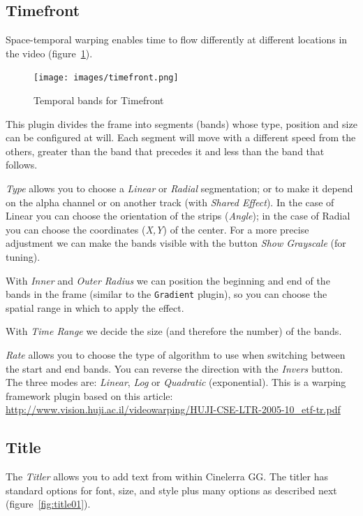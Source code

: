 {\subsection{Timefront}%
\label{sub:timefront}

Space-temporal warping enables time to flow differently at different locations in the video (figure~\ref{fig:timefront}).
\begin{figure} 
    \vspace{-2ex}
    \texttt{[image: images/timefront.png]}
    \caption{Temporal bands for Timefront}
    \label{fig:timefront}
\end{figure}
This plugin divides the frame into segments (bands) whose type, position and size can be configured at will. Each segment will move with a different speed from the others, greater than the band that precedes it and less than the band that follows.

\textit{Type} allows you to choose a \textit{Linear} or \textit{Radial} segmentation; or to make it depend on the alpha channel or on another track (with \textit{Shared Effect}). In the case of Linear you can choose the orientation of the strips (\textit{Angle}); in the case of Radial you can choose the coordinates (\textit{X,Y}) of the center. For a more precise adjustment we can make the bands visible with the button \textit{Show Grayscale} (for tuning).

With \textit{Inner} and \textit{Outer Radius} we can position the beginning and end of the bands in the frame (similar to the \texttt{Gradient} plugin), so you can choose the spatial range in which to apply the effect.

With \textit{Time Range} we decide the size (and therefore the number) of the bands.

\textit{Rate} allows you to choose the type of algorithm to use when switching between the start and end bands. You can reverse the direction with the \textit{Invers} button. The three modes are: \textit{Linear}, \textit{Log} or \textit{Quadratic} (exponential). This is a warping framework plugin based on this article: {\small \url{http://www.vision.huji.ac.il/videowarping/HUJI-CSE-LTR-2005-10_etf-tr.pdf}}

\subsection{Title}%
\label{sub:title}

The \textit{Titler} allows you to add text from within Cinelerra GG. The titler has standard options for font, size, and style plus many options as described next (figure~\ref{fig:title01}).

}
